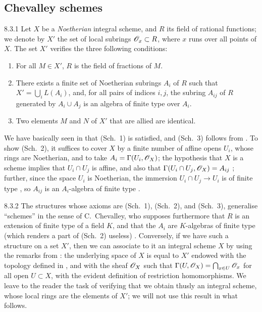 \subsection{Chevalley schemes}
\label{1-schemes-8.3}

\begin{env}{8.3.1}
\label{env-1.8.3.1}
Let $X$ be a \emph{Noetherian} integral scheme, and $R$ its
field of rational functions; we denote by $X'$ the set of local subrings
$\mathscr{O}_x\subset R$, where $x$ runs over all points of $X$. The set $X'$ verifies
the three following conditions:
\begin{enumerate}
  \item[(Sch.~1)] For all $M\in X'$, $R$ is the field of fractions of $M$.
  \item[(Sch.~2)] There exists a finite set of Noetherian subrings $A_i$ of $R$
  such that $X'=\bigcup_i L(A_i)$, and, for all pairs of indices $i,j$, the subring
  $A_{ij}$ of $R$ generated by $A_i\cup A_j$ is an algebra of finite type over $A_i$.
  \item[(Sch.~3)] Two elements $M$ and $N$ of $X'$ that are allied are identical.
\end{enumerate}
\end{env}

We have basically seen in  that (Sch.~1) is satisfied, and (Sch.~3)
follows from . To show (Sch.~2), it suffices to cover $X$ by a
finite number of affine opens $U_i$, whose rings are Noetherian, and to take
$A_i=\Gamma(U_i,\mathscr{O}_X)$; the hypothesis that $X$ is a scheme implies that
$U_i\cap U_j$ is affine, and also that $\Gamma(U_i\cap U_j,\mathscr{O}_X)=A_{ij}$
; further, since the space $U_i$ is Noetherian, the immersion
$U_i\cap U_j\to U_i$ is of finite type , so $A_{ij}$ is an
$A_i$-algebra of finite type .

\begin{env}{8.3.2}
\label{env-1.8.3.2}
The structures whose axioms are (Sch.~1), (Sch.~2), and
(Sch.~3), generalise ``schemes'' in the sense of C.~Chevalley, who supposes
furthermore that $R$ is an extension of finite type of a field $K$, and that the
$A_i$ are $K$-algebras of finite type (which renders a part of (Sch.~2) useless)
\cite{1}. Conversely, if we have such a structure on a set $X'$, then we can
associate to it an integral scheme $X$ by using the remarks from :
the underlying space of $X$ is equal to $X'$ endowed with the topology defined
in , and with the sheaf $\mathscr{O}_X$ such that
$\Gamma(U,\mathscr{O}_X)=\bigcap_{x\in U}\mathscr{O}_x$ for all open $U\subset X$, with the
evident definition of restriction homomorphisms. We leave to the reader the
task of verifying that we obtain thusly an integral scheme, whose local rings
are the elements of $X'$; we will not use this result in what follows.
\end{env}

